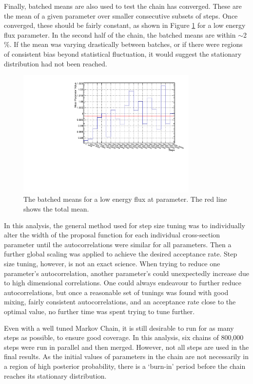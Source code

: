 Finally, batched means are also used to test the chain has converged. These are the mean of a given parameter over smaller consecutive subsets of steps. Once converged, these should be fairly constant, as shown in Figure \ref{fig:batch} for a low energy flux parameter. In the second half of the chain, the batched means are within $\sim$2$\%$. If the mean was varying drastically between batches, or if there were regions of consistent bias beyond statistical fluctuation, it would suggest the stationary distribution had not been reached.

\begin{figure}[!htbp]
\centering
\includegraphics*[width=0.8\textwidth,clip]{figs/batch}
\caption{The batched means for a low energy flux at parameter. The red line shows the total mean.}\label{fig:batch}
\end{figure}

In this analysis, the general method used for step size tuning was to individually alter the width of the proposal function for each individual cross-section parameter until the autocorrelations were similar for all parameters. Then a further global scaling was applied to achieve the desired acceptance rate. Step size tuning, however, is not an exact science. When trying to reduce one parameter's autocorrelation, another parameter's could unexpectedly increase due to high dimensional correlations. One could always endeavour to further reduce autocorrelations, but once a reasonable set of tunings was found with good mixing, fairly consistent autocorrelations, and an acceptance rate close to the optimal value, no further time was spent trying to tune further.

Even with a well tuned Markov Chain, it is still desirable to run for as many steps as possible, to ensure good coverage. In this analysis, six chains of 800,000 steps were run in parallel and then merged. However, not all steps are used in the final results. As the initial values of parameters in the chain are not necessarily in a region of high posterior probability, there is a `burn-in' period before the chain reaches its stationary distribution.

